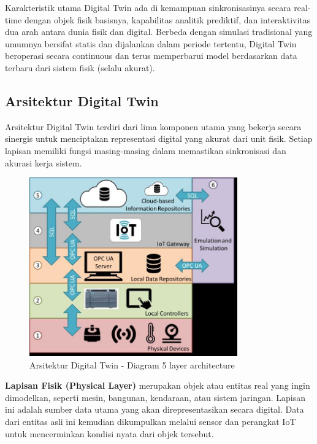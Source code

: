 Karakteristik utama Digital Twin ada di kemampuan sinkronisasinya secara real-time dengan objek fisik basisnya, kapabilitas analitik prediktif, dan interaktivitas dua arah antara dunia fisik dan digital. Berbeda dengan simulasi tradisional yang umumnya bersifat statis dan dijalankan dalam periode tertentu, Digital Twin beroperasi secara continuous dan terus memperbarui model berdasarkan data terbaru dari sistem fisik (selalu akurat).

\subsection{Arsitektur Digital Twin}

Arsitektur Digital Twin terdiri dari lima komponen utama yang bekerja secara sinergis untuk menciptakan representasi digital yang akurat dari unit fisik. Setiap lapisan memiliki fungsi masing-masing dalam memastikan sinkronisasi dan akurasi kerja sistem.

\begin{figure}[htbp]
    \centering
    \includegraphics[width=0.8\textwidth]{assets/pics/bab3_2.png}
    \caption{Arsitektur Digital Twin - Diagram 5 layer architecture}
    \label{fig:digital_twin_concept}
\end{figure}


\textbf{Lapisan Fisik (Physical Layer)} merupakan objek atau entitas real yang ingin dimodelkan, seperti mesin, bangunan, kendaraan, atau sistem jaringan. Lapisan ini adalah sumber data utama yang akan direpresentasikan secara digital. Data dari entitas asli ini kemudian dikumpulkan melalui sensor dan perangkat IoT untuk mencerminkan kondisi nyata dari objek tersebut.

